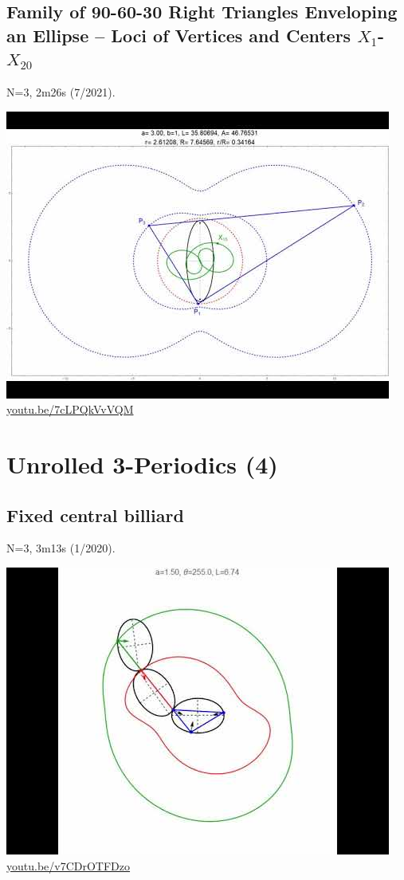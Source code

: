 \documentclass[12pt]{amsart}
\begin{document}
\subsection{Family of 90-60-30 Right Triangles Enveloping an Ellipse -- Loci of Vertices and Centers $X_{1}$-$X_{20}$}
\label{vid:7cLPQkVvVQM}
\noindent N=3, 2m26s (7/2021). 
\begin{center}\includegraphics[width=.5\textwidth]{pics/7cLPQkVvVQM.jpg} \\ 
\href{https://youtu.be/7cLPQkVvVQM}{\url{youtu.be/7cLPQkVvVQM}}\end{center}
% 


\section{Unrolled 3-Periodics (4)}

\subsection{Fixed central billiard}
\label{vid:v7CDrOTFDzo}
\noindent N=3, 3m13s (1/2020). 
\begin{center}\includegraphics[width=.5\textwidth]{pics/v7CDrOTFDzo.jpg} \\ 
\href{https://youtu.be/v7CDrOTFDzo}{\url{youtu.be/v7CDrOTFDzo}}\end{center}
% 
\end{document}

